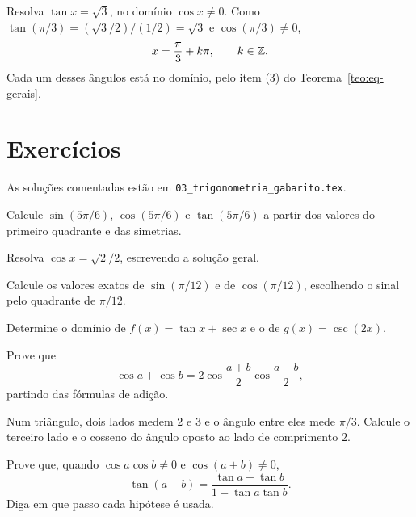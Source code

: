 \documentclass[11pt,a4paper]{article}
\begin{document}
\begin{exemplo}
Resolva $\tan x=\sqrt{3}$, no domínio $\cos x\neq 0$. Como $\tan(\pi/3)=(\sqrt{3}/2)/(1/2)=\sqrt{3}$ e $\cos(\pi/3)\neq 0$,
\[
x=\frac{\pi}{3}+k\pi,\qquad k\in\mathbb{Z}.
\]
Cada um desses ângulos está no domínio, pelo item (3) do Teorema~\ref{teo:eq-gerais}.
\end{exemplo}

\section{Exercícios}

As soluções comentadas estão em \texttt{03\_trigonometria\_gabarito.tex}.

\begin{exercicio}
Calcule $\sin(5\pi/6)$, $\cos(5\pi/6)$ e $\tan(5\pi/6)$ a partir dos valores do primeiro quadrante e das simetrias.
\end{exercicio}

\begin{exercicio}
Resolva $\cos x=\sqrt{2}/2$, escrevendo a solução geral.
\end{exercicio}

\begin{exercicio}
Calcule os valores exatos de $\sin(\pi/12)$ e de $\cos(\pi/12)$, escolhendo o sinal pelo quadrante de $\pi/12$.
\end{exercicio}

\begin{exercicio}
Determine o domínio de $f(x)=\tan x+\sec x$ e o de $g(x)=\csc(2x)$.
\end{exercicio}

\begin{exercicio}
Prove que
\[
\cos a+\cos b=2\cos\frac{a+b}{2}\cos\frac{a-b}{2},
\]
partindo das fórmulas de adição.
\end{exercicio}

\begin{exercicio}
Num triângulo, dois lados medem $2$ e $3$ e o ângulo entre eles mede $\pi/3$. Calcule o terceiro lado e o cosseno do ângulo oposto ao lado de comprimento $2$.
\end{exercicio}

\begin{exercicio}
Prove que, quando $\cos a\cos b\neq 0$ e $\cos(a+b)\neq 0$,
\[
\tan(a+b)=\frac{\tan a+\tan b}{1-\tan a\tan b}.
\]
Diga em que passo cada hipótese é usada.
\end{exercicio}
\end{document}
